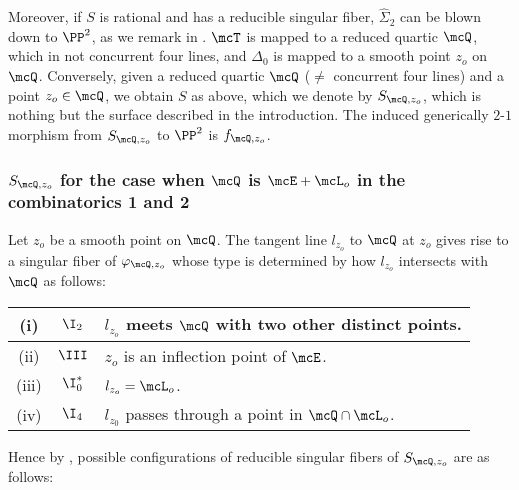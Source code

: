 Moreover, if $S$ is rational and has a reducible singular fiber, $\widehat{\Sigma}_2$ can be blown
down to $\PP^2$, as we remark in \cite[1.2.2]{bannai-tokunaga}.  $\mcT$ is mapped to
a reduced quartic $\mcQ$, which in not concurrent four lines,  and $\Delta_0$ is mapped to a smooth point $z_o$ on
 $\mcQ$.  Conversely, given a reduced quartic $\mcQ$ ($\neq$ concurrent four lines) and a point 
 $z_o \in \mcQ$, we obtain $S$ as above, which we denote by $S_{\mcQ, z_o}$, which is nothing but the surface described in the introduction. The induced
 generically $2$-$1$ morphism from $S_{\mcQ, z_o}$ to $\PP^2$ is $f_{\mcQ, z_o}$. 
 
 
 
 \subsubsection {$S_{\mcQ, z_o}$ for the case when $\mcQ$ is $\mcE + \mcL_o$ in the combinatorics 1 and 2}
 
 Let $z_{o}$ be a smooth point on $\mcQ$. The tangent line $l_{z_{o}}$ to $\mcQ$ at $z_{o}$ gives rise to a singular fiber of ${\varphi}_{\mcQ , z_{o}}$ whose type is determined by how $l_{z_{o}}$ intersects with $\mcQ$ as follows:

\begin{center}
\begin{tabular}{|c|c|l|} \hline
(i) & $\I_{2}$ & $l_{z_{o}}$ meets $\mcQ$ with two other distinct points. \\ \hline
(ii) & $\III$ & $z_{o}$ is an inflection point of $\mcE$. \\ \hline
(iii) & $\I_{0}^{\ast}$ & $l_{z_{o}} = {\mcL}_{o}$. \\ \hline
(iv) & $\I_{4}$ & $l_{z_{0}}$ passes through a  point in  $\mcQ\cap \mcL_o$. \\ \hline
\end{tabular}
\end{center}


 Hence by  \cite[Table 6.2]{miranda-persson},  possible configurations of reducible singular fibers of $S_{\mcQ, z_o}$ are
 as follows:

 

